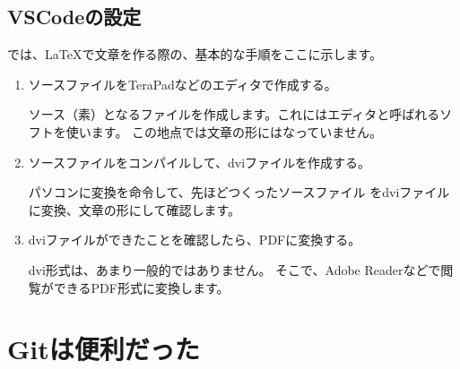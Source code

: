\documentclass[a4j,12pt]{jreport}
\begin{document}
        \section{VSCodeの設定}

            では、\LaTeX で文章を作る際の、基本的な手順をここに示します。


            \begin{enumerate}
                \item ソースファイルをTeraPadなどのエディタで作成する。
                
                ソース（素）となるファイルを作成します。これにはエディタと呼ばれるソフトを使います。
                この地点では文章の形にはなっていません。
                
                \item ソースファイルをコンパイルして、dviファイルを作成する。
                
                パソコンに変換を命令して、先ほどつくったソースファイル
                をdviファイルに変換、文章の形にして確認します。
                
                \item dviファイルができたことを確認したら、PDFに変換する。
                
                dvi形式は、あまり一般的ではありません。
                そこで、Adobe Readerなどで閲覧ができるPDF形式に変換します。
            
            \end{enumerate}

    \chapter{Gitは便利だった}
\end{document}
